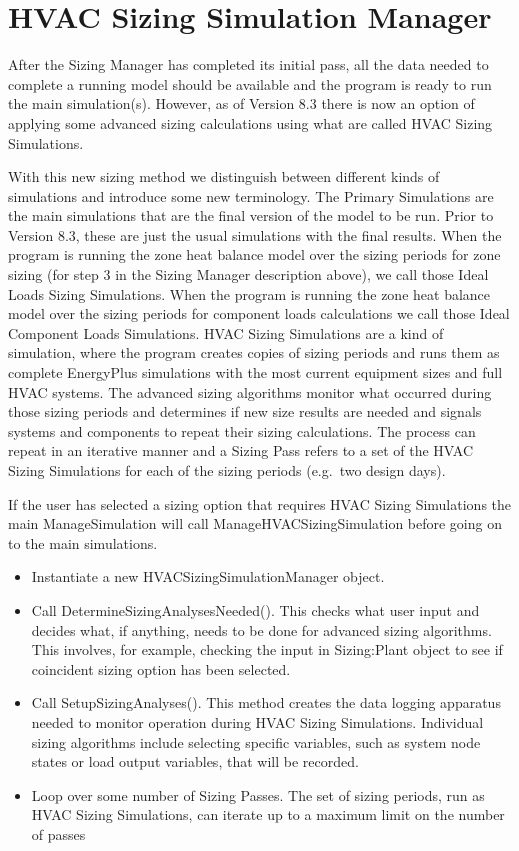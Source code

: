 \section{HVAC Sizing Simulation Manager}\label{hvac-sizing-simulation-manager}

After the Sizing Manager has completed its initial pass, all the data needed to complete a running model should be available and the program is ready to run the main simulation(s). However, as of Version 8.3 there is now an option of applying some advanced sizing calculations using what are called HVAC Sizing Simulations.

With this new sizing method we distinguish between different kinds of simulations and introduce some new terminology. The Primary Simulations are the main simulations that are the final version of the model to be run. Prior to Version 8.3, these are just the usual simulations with the final results. When the program is running the zone heat balance model over the sizing periods for zone sizing (for step 3 in the Sizing Manager description above), we call those Ideal Loads Sizing Simulations. When the program is running the zone heat balance model over the sizing periods for component loads calculations we call those Ideal Component Loads Simulations. HVAC Sizing Simulations are a kind of simulation, where the program creates copies of sizing periods and runs them as complete EnergyPlus simulations with the most current equipment sizes and full HVAC systems. The advanced sizing algorithms monitor what occurred during those sizing periods and determines if new size results are needed and signals systems and components to repeat their sizing calculations. The process can repeat in an iterative manner and a Sizing Pass refers to a set of the HVAC Sizing Simulations for each of the sizing periods (e.g.~two design days).

If the user has selected a sizing option that requires HVAC Sizing Simulations the main ManageSimulation will call ManageHVACSizingSimulation before going on to the main simulations.

\begin{itemize}
\item
  Instantiate a new HVACSizingSimulationManager object.
\item
  Call DetermineSizingAnalysesNeeded(). This checks what user input and decides what, if anything, needs to be done for advanced sizing algorithms. This involves, for example, checking the input in Sizing:Plant object to see if coincident sizing option has been selected.
\item
  Call SetupSizingAnalyses(). This method creates the data logging apparatus needed to monitor operation during HVAC Sizing Simulations. Individual sizing algorithms include selecting specific variables, such as system node states or load output variables, that will be recorded.
\item
  Loop over some number of Sizing Passes. The set of sizing periods, run as HVAC Sizing Simulations, can iterate up to a maximum limit on the number of passes
\end{itemize}

